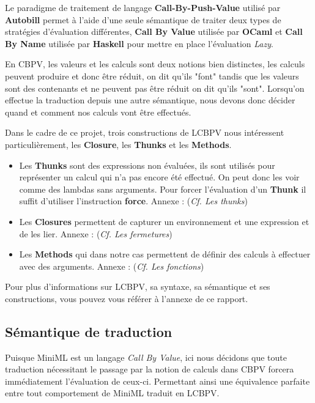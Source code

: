 \documentclass[12pt]{article}
\begin{document}
Le paradigme de traitement de langage \textbf{Call-By-Push-Value}
utilisé par \textbf{Autobill} permet à l'aide d'une seule sémantique de
traiter deux types de stratégies d'évaluation différentes, \textbf{Call
      By Value} utilisée par \textbf{OCaml} et \textbf{Call By Name} utilisée
par \textbf{Haskell} pour mettre en place l'évaluation \emph{Lazy}.

En CBPV, les valeurs et les calculs sont deux notions bien distinctes, les calculs peuvent produire et donc être réduit, on dit qu'ils "font"
tandis que les valeurs sont des contenants et ne peuvent pas être réduit on dit qu'ils "sont".
Lorsqu'on effectue la traduction depuis une autre sémantique, nous devons donc décider quand et comment nos calculs vont être effectués.

Dans le cadre de ce projet, trois constructions de LCBPV nous intéressent particulièrement, les \textbf{Closure}, les \textbf{Thunks} et les \textbf{Methods}.
\begin{itemize}
      \item
            Les \textbf{Thunks} sont des expressions non évaluées, ils sont utilisés pour représenter un calcul qui n'a pas encore été effectué.
            On peut donc les voir comme des lambdas sans arguments.
            Pour forcer l'évaluation d'un \textbf{Thunk} il suffit d'utiliser l'instruction  \textbf{force}.
            Annexe : (\textit{Cf. Les thunks})
      \item
            Les \textbf{Closures} permettent de capturer un environnement et une expression et de les lier.
            Annexe : (\textit{Cf. Les fermetures})
      \item
            Les \textbf{Methods} qui dans notre cas permettent de définir des calculs à effectuer avec des arguments.
            Annexe : (\textit{Cf. Les fonctions})
\end{itemize}
Pour plus d'informations sur LCBPV, sa syntaxe, sa sémantique et ses constructions, vous pouvez vous référer à l'annexe de ce rapport.

\hypertarget{sémantique-de-traduction}{%
      \subsection{Sémantique de traduction}\label{sémantique-de-traduction}}

Puisque MiniML est un langage \emph{Call By Value}, ici nous décidons que toute traduction nécessitant le passage par la notion de calculs dans CBPV forcera immédiatement l'évaluation de ceux-ci.
Permettant ainsi une équivalence parfaite entre tout comportement de MiniML traduit en LCBPV.
\end{document}
